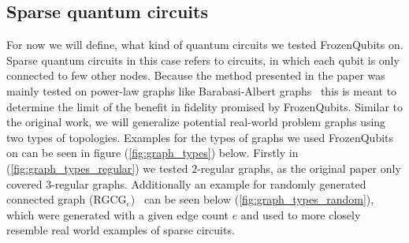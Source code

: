 \subsection{Sparse quantum circuits}
For now we will define, what kind of quantum circuits we tested FrozenQubits on. Sparse quantum circuits in this case refers to circuits, in which each qubit is only connected to few other nodes. Because the method presented in the paper was mainly tested on power-law graphs like Barabasi-Albert graphs~\cite{barabasi} this is meant to determine the limit of the benefit in fidelity promised by FrozenQubits. Similar to the original work, we will generalize potential real-world problem graphs using two types of topologies. Examples for the types of graphs we used FrozenQubits on can be seen in figure (\ref{fig:graph_types}) below. Firstly in (\ref{fig:graph_types_regular}) we tested $2$-regular graphs, as the original paper only covered $3$-regular graphs. Additionally an example for randomly generated connected graph (RGCG$_e$)~\cite{RGCG} can be seen below (\ref{fig:graph_types_random}), which were generated with a given edge count $e$ and used to more closely resemble real world examples of sparse circuits. 
